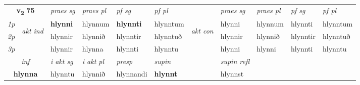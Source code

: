 \noindent
\begin{tabular}{lllllllllll} \toprule
\multicolumn{2}{c}{\textbf{v{\textsubscript{2}}} \Large{\textbf{75}}}  &  \textit{praes sg}  & \textit{praes pl}  &\textit{ pf sg} & \textit{pf pl} &  &  \textit{praes sg}  & \textit{praes pl}  & \textit{pf sg} & \textit{pf pl } \\*
	\cmidrule{3-6} \cmidrule{8-11}
 {\textit{1p}} & \multirow{3}{*}{\begin{turn}{90}\textit{akt ind}\end{turn}} & \textbf{hlynni} & hlynnum & \textbf{hlynnti} & hlynntum & \multirow{3}{*}{\begin{turn}{90}\textit{akt con}\end{turn}} &hlynni & hlynnum & hlynnti & hlynntum\\*
 {\textit{2p}} &  &  hlynnir  & hlynnið & hlynntir & hlynntuð & & hlynnir & hlynnið & hlynntir & hlynntuð \\*
{\textit{3p}} &  & hlynnir & hlynna & hlynnti & hlynntu & & hlynni & hlynni& hlynnti & hlynntu \\*
\cmidrule{3-6} \cmidrule{8-11}

   \multicolumn{2}{c}{\textit{inf}}  & \textit{i akt sg} & \textit{i akt pl}   & \textit{presp} & \textit{supin} && \textit{supin refl}  \\*
  \multicolumn{2}{c}{\textbf{hlynna}} & hlynntu  & hlynnið   & hlynnandi &  \textbf{hlynnt} && hlynnst  \\*
\end{tabular}

